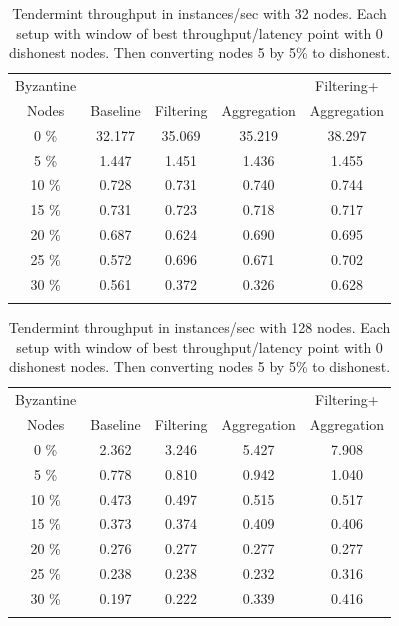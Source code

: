 \begin{table}[h!]
\centering
	\begin{tabular}{c c c c c }
	\hline
     Byzantine     &        &       &       & Filtering+  \\ 
	 Nodes & Baseline   & Filtering    & Aggregation    & Aggregation  \\  \hline
	 0 \%  		    & 		32.177		&	35.069	&	35.219	& 38.297  \\
	 5 \%  		    & 		1.447		&	1.451	&	1.436	& 1.455  \\
	 10 \%  		& 		0.728		&	0.731	&	0.740	& 0.744  \\
	 15 \%  		& 		0.731		&	0.723	&	0.718	& 0.717  \\
	 20 \%  		& 		0.687		&	0.624	&	0.690	& 0.695  \\
	 25 \%  		& 		0.572		&	0.696	&	0.671	& 0.702  \\
	 30 \%  		& 		0.561		&	0.372	&	0.326	& 0.628  \\ \hline \\
	\end{tabular}
	\caption{Tendermint throughput in instances/sec with 32 nodes. 
 Each setup with window of best throughput/latency point with 0 dishonest nodes.   Then converting nodes 5 by 5\% to dishonest.}
 \label{tab:biz32}
\end{table}

\begin{table}[h!]
\centering
	\begin{tabular}{c c c c c }
	\hline
     Byzantine     &        &       &       & Filtering+  \\ 
	 Nodes & Baseline   & Filtering    & Aggregation    & Aggregation  \\  \hline
	 0 \%  		    & 		2.362		&	3.246	&	5.427	& 7.908  \\
	 5 \%  		    & 		0.778		&	0.810	&	0.942	& 1.040  \\
	 10 \%  		& 		0.473		&	0.497	&	0.515	& 0.517  \\
	 15 \%  		& 		0.373		&	0.374	&	0.409	& 0.406  \\
	 20 \%  		& 		0.276		&	0.277	&	0.277	& 0.277  \\
	 25 \%  		& 		0.238		&	0.238	&	0.232	& 0.316  \\
	 30 \%  		& 		0.197		&	0.222	&	0.339	& 0.416  \\ \hline \\
	\end{tabular}
	\caption{Tendermint throughput in instances/sec with 128 nodes. 
 Each setup with window of best throughput/latency point with 0 dishonest nodes.   Then converting nodes 5 by 5\% to dishonest.}
  \label{tab:biz128}
\end{table}



